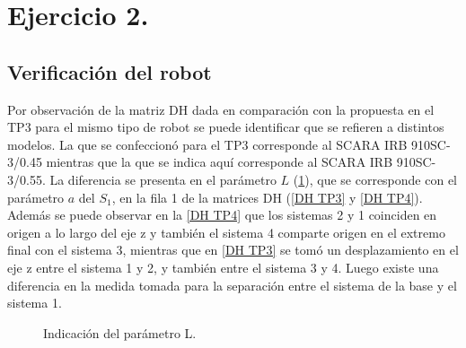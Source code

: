\documentclass[a4paper,12pt]{article}
\begin{document}
\section{Ejercicio 2.}
\subsection{Verificación del robot}
\label{subsec: verificacion}

Por observación de la matriz DH dada en comparación con la propuesta
en el TP3 para el mismo tipo de robot se puede identificar que se refieren
a distintos modelos. La que se confeccionó para el TP3 corresponde al 
SCARA IRB 910SC-3/0.45 mientras que la que se indica aquí corresponde al
SCARA IRB 910SC-3/0.55. La diferencia se presenta en el parámetro $L$ (\cref{diferencia SCARA}), que se corresponde
con el parámetro $a$ del $S_1$, en la fila 1 de la matrices DH (\cref{DH TP3} y \cref{DH TP4}). Además
se puede observar en la \cref{DH TP4} que los sistemas 2 y 1 coinciden en origen a lo largo del eje z
y también el sistema 4 comparte origen en el extremo final con el sistema 3, mientras que en \cref{DH TP3}
se tomó un desplazamiento en el eje z entre el sistema 1 y 2, y también entre el sistema 3 y 4.
Luego existe una diferencia en la medida tomada para la separación entre el sistema de la base
y el sistema 1.

\begin{figure}[H]
    \centering
    \begin{adjustbox}{scale = 0.85,max width=\columnwidth}
    \end{adjustbox}
    \caption{Indicación del parámetro L.}
    \label{diferencia SCARA}
\end{figure}
\end{document}

